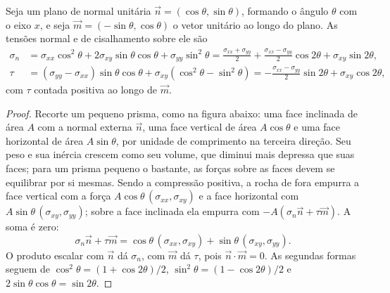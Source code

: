 \begin{proposition}\label{prop:b1:stress-strain-rheology:transformation}
Seja um plano de normal unitária $\vec n = (\cos\theta, \sin\theta)$, formando o ângulo $\theta$ com o eixo $x$, e seja $\vec m = (-\sin\theta, \cos\theta)$ o vetor unitário ao longo do plano. As tensões normal e de cisalhamento sobre ele são
\begin{align*}
  \sigma_n &= \sigma_{xx}\cos^2\theta + 2\sigma_{xy}\sin\theta\cos\theta + \sigma_{yy}\sin^2\theta
           = \frac{\sigma_{xx}+\sigma_{yy}}{2} + \frac{\sigma_{xx}-\sigma_{yy}}{2}\cos2\theta + \sigma_{xy}\sin2\theta, \\
  \tau     &= (\sigma_{yy}-\sigma_{xx})\sin\theta\cos\theta + \sigma_{xy}(\cos^2\theta - \sin^2\theta)
           = -\frac{\sigma_{xx}-\sigma_{yy}}{2}\sin2\theta + \sigma_{xy}\cos2\theta ,
\end{align*}
com $\tau$ contada positiva ao longo de $\vec m$.
\end{proposition}

\begin{proof}
Recorte um pequeno prisma, como na figura abaixo: uma face inclinada de área $A$ com a normal externa $\vec n$, uma face vertical de área $A\cos\theta$ e uma face horizontal de área $A\sin\theta$, por unidade de comprimento na terceira direção. Seu peso e sua inércia crescem como seu volume, que diminui mais depressa que suas faces; para um prisma pequeno o bastante, as forças sobre as faces devem se equilibrar por si mesmas. Sendo a compressão positiva, a rocha de fora empurra a face vertical com a força $A\cos\theta\,(\sigma_{xx}, \sigma_{xy})$ e a face horizontal com $A\sin\theta\,(\sigma_{xy}, \sigma_{yy})$; sobre a face inclinada ela empurra com $-A(\sigma_n\vec n + \tau\vec m)$. A soma é zero:
\[
  \sigma_n\vec n + \tau\vec m = \cos\theta\,(\sigma_{xx}, \sigma_{xy}) + \sin\theta\,(\sigma_{xy}, \sigma_{yy}) .
\]
O produto escalar com $\vec n$ dá $\sigma_n$, com $\vec m$ dá $\tau$, pois $\vec n\cdot\vec m = 0$. As segundas formas seguem de $\cos^2\theta = (1+\cos2\theta)/2$, $\sin^2\theta = (1-\cos2\theta)/2$ e $2\sin\theta\cos\theta = \sin2\theta$.
\end{proof}

